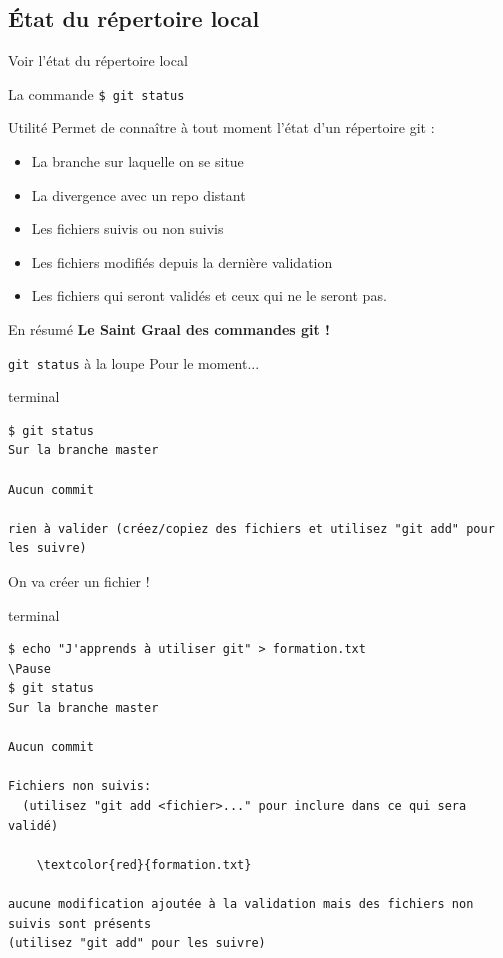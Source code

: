 \documentclass[usepdftitle=false]{beamer}
\def\seplength{.3\topsep}
\newcommand{\Pause}{%
\ifdef{\Release}
  {\pause}
  {}
}
\begin{document}
\subsection{\'Etat du répertoire local}

\begin{frame}[fragile]{Voir l'état du répertoire local}
	\begin{block}{La commande}
		\verb+$ git status+
	\end{block}
	\begin{block}{Utilité}
		Permet de connaître à tout moment l'état d'un répertoire git :
		\begin{itemize}
			\item La branche sur laquelle on se situe
			\item La divergence avec un repo distant
			\item Les fichiers suivis ou non suivis
			\item Les fichiers modifiés depuis la dernière validation
			\item Les fichiers qui seront validés et ceux qui ne le seront pas.
		\end{itemize}
	\end{block}
	\begin{block}{En résumé}
		{\bf Le Saint Graal des commandes git !}
	\end{block}
\end{frame}

\begin{frame}[fragile]{\texttt{git status} à la loupe}
	Pour le moment...

	\begin{beamercolorbox}[rounded=true,shadow=true]{terminal}
\vspace{-\seplength}
\begin{Verbatim}
$ git status
Sur la branche master

Aucun commit

rien à valider (créez/copiez des fichiers et utilisez "git add" pour les suivre)
\end{Verbatim}
	\end{beamercolorbox}

	\Pause

	On va créer un fichier !

	\begin{beamercolorbox}[rounded=true,shadow=true]{terminal}
\vspace{-\seplength}
\begin{Verbatim}
$ echo "J'apprends à utiliser git" > formation.txt
\Pause
$ git status
Sur la branche master

Aucun commit

Fichiers non suivis:
  (utilisez "git add <fichier>..." pour inclure dans ce qui sera validé)

	\textcolor{red}{formation.txt}

aucune modification ajoutée à la validation mais des fichiers non suivis sont présents
(utilisez "git add" pour les suivre)

\end{Verbatim}
\end{beamercolorbox}

\end{frame}
\end{document}
